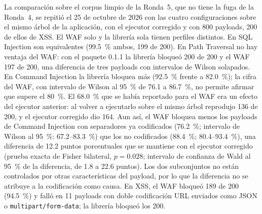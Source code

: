 La comparación sobre el corpus limpio de la Ronda~5, que no tiene la fuga de la Ronda~4, se repitió
el 25 de octubre de 2026 con las cuatro configuraciones sobre el mismo árbol de la aplicación, con
el ejecutor corregido y con 800 payloads, 200 de ellos de XSS. El WAF solo y la librería sola tienen
perfiles distintos. En SQL Injection son equivalentes (99.5~\% ambos, 199 de 200). En Path
Traversal no hay ventaja del WAF: con el paquete 0.1.1 la librería bloqueó 200 de 200 y el WAF
197 de 200, una diferencia de tres payloads con intervalos de Wilson solapados. En Command
Injection la librería bloquea más (92.5~\% frente a 82.0~\%); la cifra del WAF, con intervalo de
Wilson al 95~\% de 76.1 a 86.7~\%, no permite afirmar que supere el 80~\%. El 68.0~\% que se había
reportado para el WAF era un efecto del ejecutor anterior: al volver a ejecutarlo sobre el mismo
árbol reprodujo 136 de 200, y el ejecutor corregido dio 164. Aun así, el WAF bloquea menos los
payloads de Command Injection con separadores ya codificados (76.2~\%; intervalo de Wilson al
95~\%: 67.2--83.3~\%) que los no codificados (88.4~\%; 80.4--93.4~\%), una diferencia de 12.2
puntos porcentuales que se mantiene con el ejecutor corregido (prueba exacta de Fisher bilateral,
$p = 0.028$; intervalo de confianza de Wald al 95~\% de la diferencia, de 1.8 a 22.6 puntos). Los
dos subconjuntos no están controlados por otras características del payload, por lo que la
diferencia no se atribuye a la codificación como causa. En XSS, el WAF bloqueó 189 de 200 (94.5~\%) y falló en 11 payloads con doble
codificación URL enviados como JSON o \texttt{multipart/form-data}; la librería bloqueó los 200.


